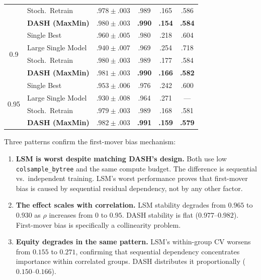 \documentclass[11pt]{article}
\newcommand{\dash}{\textsc{DASH}}
\newcommand{\rhovar}{\rho}
\begin{document}
\begin{table}[h]
\begin{tabular}{clcccc}
  & Stoch.\ Retrain      & $.978 \pm .003$ & .989 & .165 & .586 \\
  & \textbf{DASH (MaxMin)} & $\mathbf{.980} \pm .003$ & \textbf{.990} &
    \textbf{.154} & \textbf{.584} \\
\midrule
\multirow{4}{*}{0.9}
  & Single Best          & $.960 \pm .005$ & .980 & .218 & .604 \\
  & Large Single Model   & $.940 \pm .007$ & .969 & .254 & .718 \\
  & Stoch.\ Retrain      & $.980 \pm .003$ & .989 & .177 & .584 \\
  & \textbf{DASH (MaxMin)} & $\mathbf{.981} \pm .003$ & \textbf{.990} &
    \textbf{.166} & \textbf{.582} \\
\midrule
\multirow{4}{*}{0.95}
  & Single Best          & $.953 \pm .006$ & .976 & .242 & .600 \\
  & Large Single Model   & $.930 \pm .008$ & .964 & .271 & --- \\
  & Stoch.\ Retrain      & $.979 \pm .003$ & .989 & .168 & .581 \\
  & \textbf{DASH (MaxMin)} & $\mathbf{.982} \pm .003$ & \textbf{.991} &
    \textbf{.159} & \textbf{.579} \\
\bottomrule
\end{tabular}
\end{table}

Three patterns confirm the first-mover bias mechanism:

\begin{enumerate}
  \item \textbf{LSM is worst despite matching \dash{}'s design.}
    Both use low \texttt{colsample\_bytree} and the same compute budget.
    The difference is sequential vs.\ independent training. LSM's worst
    performance proves that first-mover bias is caused by sequential
    residual dependency, not by any other factor.
  \item \textbf{The effect scales with correlation.}
    LSM stability degrades from $0.965$ to $0.930$ as $\rhovar$ increases
    from $0$ to $0.95$. \dash{} stability is flat ($0.977$--$0.982$).
    First-mover bias is specifically a collinearity problem.
  \item \textbf{Equity degrades in the same pattern.}
    LSM's within-group CV worsens from $0.155$ to $0.271$, confirming that
    sequential dependency concentrates importance within correlated groups.
    \dash{} distributes it proportionally ($0.150$--$0.166$).
\end{enumerate}
\end{document}
